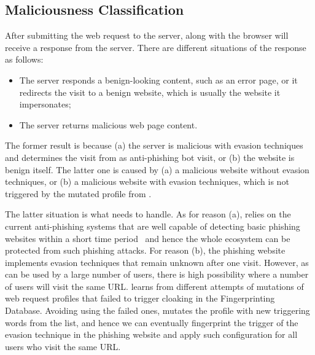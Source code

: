 \subsection{Maliciousness Classification}
After submitting the web request to the server, \spartacus along with the browser will receive a response from the server.
There are different situations of the response as follows:

\begin{itemize}
    \item The server responds a benign-looking content, such as an error page, 
    or it redirects the visit to a benign website, which is usually the website it impersonates;
    \item The server returns malicious web page content.
\end{itemize}


The former result is because (a) the server is malicious with evasion techniques and determines the visit from \spartacus as anti-phishing bot visit, or (b) the website is benign itself.
The latter one is caused by (a) a malicious website without evasion techniques, or (b) a malicious website with evasion techniques, which is not triggered by the mutated profile from \spartacus.

The latter situation is what \spartacus needs to handle.
As for reason (a), \spartacus relies on the current anti-phishing systems that are well capable of detecting basic phishing websites within a short time period~\cite{oest2020phishtime} and hence the whole ecosystem can be protected from such phishing attacks.
For reason (b), the phishing website implements evasion techniques that remain unknown after one visit.
However, as \spartacus can be used by a large number of users, there is high possibility where a number of users will visit the same URL.
\spartacus learns from different attempts of mutations of web request profiles that failed to trigger cloaking in the Fingerprinting Database.
Avoiding using the failed ones, \spartacus mutates the profile with new triggering words from the list, and hence we can eventually fingerprint the trigger of the evasion technique in the phishing website and apply such configuration for all \spartacus users who visit the same URL.







